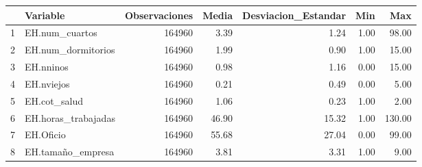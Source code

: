 \begin{table}[ht]
\centering
\begin{tabular}{rlrrrrr}
  \hline
 & Variable & Observaciones & Media & Desviacion\_Estandar & Min & Max \\ 
  \hline
1 & EH.num\_cuartos & 164960 & 3.39 & 1.24 & 1.00 & 98.00 \\ 
  2 & EH.num\_dormitorios & 164960 & 1.99 & 0.90 & 1.00 & 15.00 \\ 
  3 & EH.nninos & 164960 & 0.98 & 1.16 & 0.00 & 15.00 \\ 
  4 & EH.nviejos & 164960 & 0.21 & 0.49 & 0.00 & 5.00 \\ 
  5 & EH.cot\_salud & 164960 & 1.06 & 0.23 & 1.00 & 2.00 \\ 
  6 & EH.horas\_trabajadas & 164960 & 46.90 & 15.32 & 1.00 & 130.00 \\ 
  7 & EH.Oficio & 164960 & 55.68 & 27.04 & 0.00 & 99.00 \\ 
  8 & EH.tamaño\_empresa & 164960 & 3.81 & 3.31 & 1.00 & 9.00 \\ 
   \hline
\end{tabular}
\end{table}
